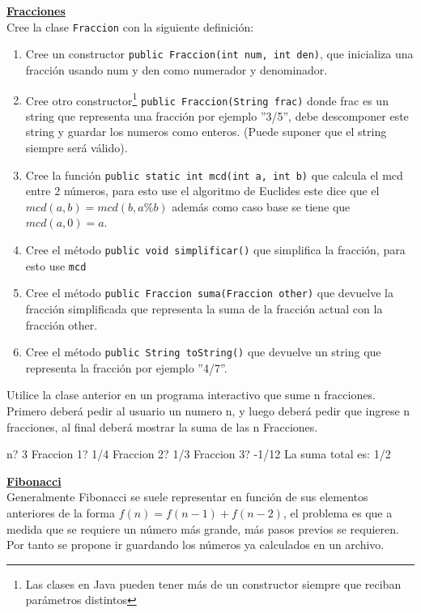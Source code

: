 \documentclass[dcc,uchile]{fcfmcourse}
\newenvironment{codebox} {\small \ttfamily \obeylines \begingroup \setstretch{-2.4}} {\endgroup}
\begin{document}
\begin{problems}
\problem \underline{\textbf{Fracciones}}\\
Cree la clase \texttt{Fraccion} con la siguiente definición:

\begin{enumerate}
\item Cree un constructor \texttt{public Fraccion(int num, int den)}, que inicializa una fracción usando num y den como numerador y denominador.
\item Cree otro constructor\footnote{Las clases en Java pueden tener más de un constructor siempre que reciban parámetros distintos} \texttt{public Fraccion(String frac)} donde frac es un string que representa una fracción por ejemplo ''3/5'', debe descomponer este string y guardar los numeros como enteros. (Puede suponer que el string siempre será válido).
\item Cree la función \texttt{public static int mcd(int a, int b)} que calcula el mcd entre 2 números, para esto use el algoritmo de Euclides este dice que el $mcd(a,b)=mcd(b,a\%b)$ además como caso base se tiene que $mcd(a,0)=a$.
\item Cree el método \texttt{public void simplificar()} que simplifica la fracción, para esto use \texttt{mcd}
\item Cree el método \texttt{public Fraccion suma(Fraccion other)} que devuelve la fracción simplificada que representa la suma de la fracción actual con la fracción other.
\item Cree el método \texttt{public String toString()} que devuelve un string que representa la fracción por ejemplo ''4/7''.
\end{enumerate}
\newpage
Utilice la clase anterior en un programa interactivo que sume n fracciones. Primero deberá pedir al usuario un numero n, y luego deberá pedir que ingrese n fracciones, al final deberá mostrar la suma de las n Fracciones.

\begin{codebox}
n?
3
Fraccion 1?
1/4
Fraccion 2?
1/3
Fraccion 3?
-1/12
La suma total es: 1/2
\end{codebox}


\problem \underline{\textbf{Fibonacci}}\\
Generalmente Fibonacci se suele representar en función de sus elementos anteriores de la forma $f(n) = f(n-1) + f(n-2)$, el problema es que a medida que se requiere un número más grande, más pasos previos se requieren. Por tanto se propone ir guardando los números ya calculados en un archivo.


\end{problems}
\end{document}
